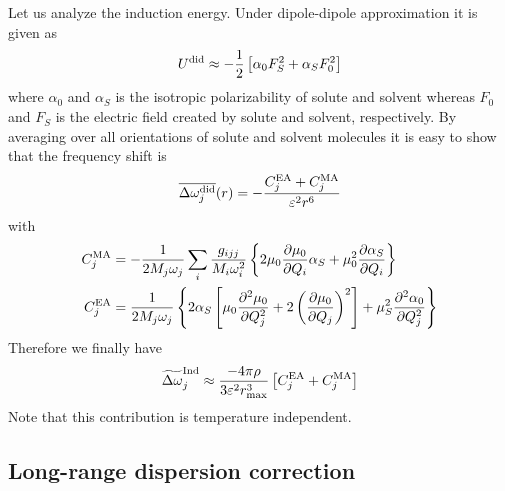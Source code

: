 \documentclass[a4paper,titlepage,twoside,fleqn,12pt]{book}
\newcommand{\fderiv}[2]{\ensuremath{
\frac{\partial #1}{\partial #2}}}
\newcommand{\sderiv}[2]{\ensuremath{
\frac{\partial^2 #1}{\partial #2^2}
}}
\begin{document}
\begin{refsection}
Let us analyze the induction energy. Under dipole\hyp{}dipole
approximation it is given as
%
\begin{equation}
 U^{\rm did} \approx -\frac{1}{2} \left[ \alpha_0 F_S^2 + \alpha_S F_0^2\right]
\end{equation}
%
where $\alpha_0$ and $\alpha_S$ is the isotropic polarizability
of solute and solvent whereas $F_0$ and $F_S$ is the electric field
created by solute and solvent, respectively.
By averaging over all orientations of solute and solvent
molecules it is easy to show that
the frequency shift is
%
\begin{equation}
 \overline{\Delta \omega_j^{\rm did}}(r) = 
-\frac{C_j^{\rm EA} + C_j^{\rm MA} }{\varepsilon^2 r^6}
\end{equation}
%
with
%
\begin{subequations}
\begin{align}
  C_j^{\rm MA} &= -\frac{1}{2M_j\omega_j}\sum_i \frac{g_{ijj}}{M_i\omega_i^2} \left\{ 
   2\mu_0\fderiv{\mu_0}{Q_i}\alpha_S + \mu_0^2\fderiv{\alpha_S}{Q_i}
\right\} \\
  C_j^{\rm EA} &= \frac{1}{2M_j\omega_j} \left\{ 
  2\alpha_S\left[
      \mu_0\sderiv{\mu_0}{Q_j} + 2\left(\fderiv{\mu_0}{Q_j}\right)^2 
    \right]
   + \mu_S^2 \sderiv{\alpha_0}{Q_j}
\right\}
\end{align}
\end{subequations}
%
Therefore we finally have
%
\begin{equation} \label{e:x12341}
 \widetilde{\Delta \omega}_j^{\rm Ind} \approx
\frac{-4\pi\rho}{3\varepsilon^2 r_{\max}^3} \left[ C_j^{\rm EA} + C_j^{\rm MA} \right]
\end{equation}
%
Note that this contribution is temperature independent.

\subsection{Long\hyp{}range dispersion correction}


\end{refsection}
\end{document}
